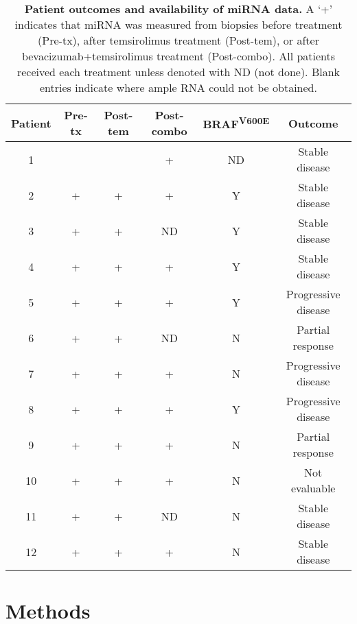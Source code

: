 \begin{table*}
\begin{center}
\begin{tabular}{ c c c c c c }
Patient & Pre-tx & Post-tem & Post-combo & BRAF\textsuperscript{V600E} & Outcome \\ \hline
1 &   &   & + & ND    & Stable disease \\
2 & + & + & + & Y & Stable disease \\
3 & + & + & ND & Y & Stable disease \\
4 & + & + & + & Y & Stable disease \\
5 & + & + & + & Y & Progressive disease \\
6 & + & + & ND & N & Partial response \\
7 & + & + & + & N & Progressive disease \\
8 & + & + & + & Y & Progressive disease \\
9 & + & + & + & N & Partial response \\
10 & + & + & + & N & Not evaluable \\
11 & + & + & ND & N & Stable disease \\
12 & + & + & + & N & Stable disease \\
\end{tabular}
\end{center}
\caption[Patient outcomes and availability of miRNA data]{
    \textbf{Patient outcomes and availability of miRNA data.}
    A `+' indicates that miRNA was measured from biopsies 
    before treatment (Pre-tx), after temsirolimus treatment (Post-tem),
    or after bevacizumab+temsirolimus treatment (Post-combo). All patients
    received each treatment unless denoted with ND (not done). Blank entries indicate where
    ample RNA could not be obtained.}
\label{jtm:table1}
\end{table*}

\section{Methods}


